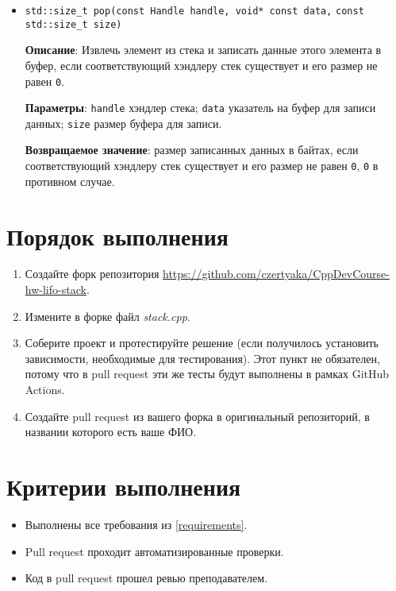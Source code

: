 \documentclass[14pt]{extarticle}
\begin{document}
\begin{itemize}
            \item \verb|std::size_t pop(const Handle handle, void* const data,| \break
                \verb|const std::size_t size)|

                \textbf{Описание}: Извлечь элемент из стека и записать данные этого элемента
                в буфер, если соответствующий хэндлеру стек существует и его размер не равен
                \texttt{0}.

                \textbf{Параметры}: \texttt{handle} \textemdash \space хэндлер стека; \hfill \break
                \texttt{data} \textemdash \space указатель на буфер для записи данных; \hfill \break
                \texttt{size} \textemdash \space размер буфера для записи.

                \textbf{Возвращаемое значение}: размер записанных данных в байтах, если
                соответствующий хэндлеру стек существует и его размер не равен \texttt{0},
                \texttt{0} в противном случае.
            
        \end{itemize}

\section{Порядок выполнения}

    \begin{enumerate}

        \item Создайте форк репозитория \url{https://github.com/czertyaka/CppDevCourse-hw-lifo-stack}.

        \item Измените в форке файл \textit{stack.cpp}.

        \item Соберите проект и протестируйте решение (если получилось установить зависимости,
            необходимые для тестирования).
            Этот пункт не обязателен, потому что в pull request эти же тесты будут выполнены
            в рамках GitHub Actions.

        \item Создайте pull request из вашего форка в оригинальный репозиторий,
            в названии которого есть ваше ФИО.

    \end{enumerate}

\section{Критерии выполнения}

    \begin{itemize}

        \item Выполнены все требования из \ref{requirements}.

        \item Pull request проходит автоматизированные проверки.

        \item Код в pull request прошел ревью преподавателем.

    \end{itemize}
\end{document}
